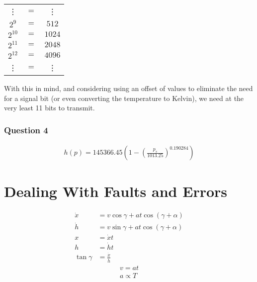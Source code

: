 \documentclass[english,palatino]{ist-report}
\begin{document}
\begin{table}[ht]
	\centering
	\begin{tabular}{ccc}
		\vdots		& $=$	& \vdots	\\
		$2^9$		& $=$	& $512$		\\
		$2^{10}$	& $=$	& $1024$	\\
		$2^{11}$	& $=$	& $2048$	\\
		$2^{12}$	& $=$	& $4096$	\\
		\vdots		& $=$	& \vdots	\\
	\end{tabular}
\end{table}

With this in mind, and considering using an offset of values to eliminate the need for a signal bit (or even converting the temperature to Kelvin), we need at the very least 11 bits to transmit.

\section{Question 4}

\begin{gather*}
	h(p) = 145366.45\left(1 - \left(\frac{p_s}{1013.25}\right)^{0.190284}\right)
\end{gather*}

\part{Dealing With Faults and Errors}

\begin{align*}
	\dot{x} &= v\cos\gamma + at\cos(\gamma + \alpha) \\
	\dot{h} &= v\sin\gamma + at\cos(\gamma + \alpha) \\
	x &= \dot{x}t \\
	h &= \dot{h}t \\
	\tan\gamma &= \frac{\dot{x}}{\dot{h}}
\end{align*}
\begin{gather*}
	v = at \\
	a \propto T \\
\end{gather*}
\end{document}
